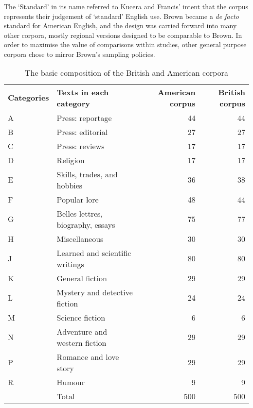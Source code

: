 The `Standard' in its name referred to Kucera and Francis' intent that the corpus represents their judgement of `standard' English use.  Brown became a \textsl{de facto} standard for American English, and the design was carried forward into many other corpora, mostly regional versions designed to be comparable to Brown\cite{hundt1999manual,johansson1986tagged,hundt1998manual,shastri1988kolhapur,collins1988australian,bauer1993manual,mcenery2004lancaster}.  In order to maximise the value of comparisons within studies, other general purpose corpora chose to mirror Brown's sampling policies.


\begin{table}[Ht]
    \centering

    \begin{tabular}{llrr}
    \hline
    Categories & Texts in each category & American corpus & British corpus \\ \hline
    A & Press: reportage & 44 & 44 \\
    B & Press: editorial & 27 & 27 \\
    C & Press: reviews & 17 & 17 \\
    D & Religion & 17 & 17 \\
    E & Skills, trades, and hobbies & 36 & 38 \\
    F & Popular lore & 48 & 44 \\
    G & Belles lettres, biography, essays & 75 & 77 \\
    H & Miscellaneous & 30 & 30 \\
    J & Learned and scientific writings & 80 & 80 \\
    K & General fiction & 29 & 29 \\
    L & Mystery and detective fiction & 24 & 24 \\
    M & Science fiction & 6 & 6 \\
    N & Adventure and western fiction & 29 & 29 \\
    P & Romance and love story & 29 & 29 \\
    R & Humour & 9 & 9 \\ \hline
      & Total & 500 & 500 \\ \hline
    \end{tabular}

    \caption{The basic composition of the British and American corpora}
    \label{table:litreview:corpora:lobdist}
\end{table}


